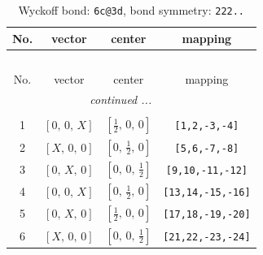 \documentclass[fleqn,8pt]{jsarticle}
\begin{document}
\begin{longtable}{cccc}
\caption{Wyckoff bond: {\tt 6c@3d}, bond symmetry: {\tt 222..}}
 \\
 \hline \hline
No. & vector & center & mapping \\ \hline \endfirsthead

\multicolumn{3}{l}{\tablename\ \thetable{}} \\
 \hline \hline
No. & vector & center & mapping \\ \hline \endhead

 \hline \hline
\multicolumn{3}{r}{\footnotesize\it continued ...} \\ \endfoot

 \hline \hline
\multicolumn{3}{r}{} \\ \endlastfoot

1 & $\left[ 0,\, 0,\, X \right]$ & $\left[ \frac{1}{2},\, 0,\, 0 \right]$ & {\tt [1,2,-3,-4]} \\ \hline
2 & $\left[ X,\, 0,\, 0 \right]$ & $\left[ 0,\, \frac{1}{2},\, 0 \right]$ & {\tt [5,6,-7,-8]} \\ \hline
3 & $\left[ 0,\, X,\, 0 \right]$ & $\left[ 0,\, 0,\, \frac{1}{2} \right]$ & {\tt [9,10,-11,-12]} \\ \hline
4 & $\left[ 0,\, 0,\, X \right]$ & $\left[ 0,\, \frac{1}{2},\, 0 \right]$ & {\tt [13,14,-15,-16]} \\ \hline
5 & $\left[ 0,\, X,\, 0 \right]$ & $\left[ \frac{1}{2},\, 0,\, 0 \right]$ & {\tt [17,18,-19,-20]} \\ \hline
6 & $\left[ X,\, 0,\, 0 \right]$ & $\left[ 0,\, 0,\, \frac{1}{2} \right]$ & {\tt [21,22,-23,-24]} \\
\end{longtable}
\renewcommand{\arraystretch}{1.2}
\end{document}
